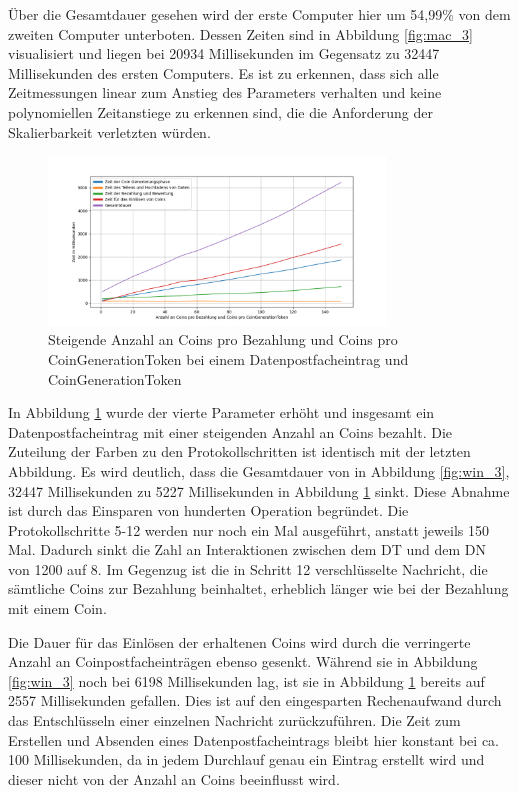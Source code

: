 \documentclass[
	fontsize=11pt,
	headings=small,
	parskip=half,           %
	bibliography=totoc,
	numbers=noenddot,       %
	open=any,               %
]{scrreprt}
\begin{document}
Über die Gesamtdauer gesehen wird der erste Computer hier um 54,99\% von dem zweiten Computer unterboten. Dessen Zeiten sind in Abbildung \ref{fig:mac_3} visualisiert und liegen bei 20934 Millisekunden im Gegensatz zu 32447 Millisekunden des ersten Computers. Es ist zu erkennen, dass sich alle Zeitmessungen linear zum Anstieg des Parameters verhalten und keine polynomiellen Zeitanstiege zu erkennen sind, die die Anforderung der Skalierbarkeit verletzten würden.


\begin{figure}[H]
    \caption{Steigende Anzahl an Coins pro Bezahlung und Coins pro CoinGenerationToken bei einem Datenpostfacheintrag und CoinGenerationToken}
    \label{fig:win_4}
    \centering
    \includegraphics[width=0.8\textwidth]{figure_win_4.png}
\end{figure}
In Abbildung \ref{fig:win_4} wurde der vierte Parameter erhöht und insgesamt ein Datenpostfacheintrag mit einer steigenden Anzahl an Coins bezahlt. Die Zuteilung der Farben zu den Protokollschritten ist identisch mit der letzten Abbildung. Es wird deutlich, dass die Gesamtdauer von in Abbildung \ref{fig:win_3}, 32447 Millisekunden zu 5227 Millisekunden in Abbildung \ref{fig:win_4} sinkt. Diese Abnahme ist durch das Einsparen von hunderten Operation begründet. Die Protokollschritte 5-12 werden nur noch ein Mal ausgeführt, anstatt jeweils 150 Mal. Dadurch sinkt die Zahl an Interaktionen zwischen dem DT und dem DN von 1200 auf 8. Im Gegenzug ist die in Schritt 12 verschlüsselte Nachricht, die sämtliche Coins zur Bezahlung beinhaltet, erheblich länger wie bei der Bezahlung mit einem Coin.

Die Dauer für das Einlösen der erhaltenen Coins wird durch die verringerte Anzahl an Coinpostfacheinträgen ebenso gesenkt. Während sie in Abbildung \ref{fig:win_3} noch bei 6198 Millisekunden lag, ist sie in Abbildung \ref{fig:win_4} bereits auf 2557 Millisekunden gefallen. Dies ist auf den eingesparten Rechenaufwand durch das Entschlüsseln einer einzelnen Nachricht zurückzuführen. Die Zeit zum Erstellen und Absenden eines Datenpostfacheintrags bleibt hier konstant bei ca. 100 Millisekunden, da in jedem Durchlauf genau ein Eintrag erstellt wird und dieser nicht von der Anzahl an Coins beeinflusst wird.
\end{document}
